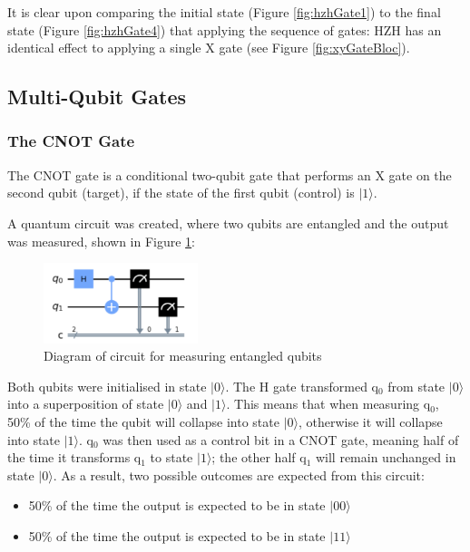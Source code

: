 It is clear upon comparing the initial state (Figure \ref{fig:hzhGate1}) to the final state (Figure \ref{fig:hzhGate4}) that applying the sequence of gates: HZH has an identical effect to applying a single X gate (see Figure \ref{fig:xyGateBloc}).

\subsection{Multi-Qubit Gates}

\subsubsection{The CNOT Gate}
The CNOT gate is a conditional two-qubit gate that performs an X gate on the second qubit (target), if the state of the first qubit (control) is  $|1\rangle$.

A quantum circuit was created, where two qubits are entangled and the output was measured, shown in Figure \ref{fig:entangleMeasure}:

\begin{figure}[H]
    \centering
    \includegraphics[width=0.4\textwidth]{lab2/images/entangleMeasure.png}
    \captionsetup{font = it, labelfont = bf, width=.91\linewidth, justification=centering}
    \caption{Diagram of circuit for measuring entangled qubits} 
    \label{fig:entangleMeasure}
\end{figure}

Both qubits were initialised in state $|0\rangle$. The H gate transformed q$_0$ from state $|0\rangle$ into a superposition of state $|0\rangle$ and $|1\rangle$. This means that when measuring q$_0$, 50\% of the time the qubit will collapse into state $|0\rangle$, otherwise it will collapse into state $|1\rangle$. q$_0$ was then used as a control bit in a CNOT gate, meaning half of the time it transforms q$_1$ to state $|1\rangle$; the other half q$_1$ will remain unchanged in state $|0\rangle$. As a result, two possible outcomes are expected from this circuit:
\begin{itemize}
    \item 50\% of the time the output is expected to be in state $|00\rangle$
    \item 50\% of the time the output is expected to be in state $|11\rangle$
\end{itemize}

